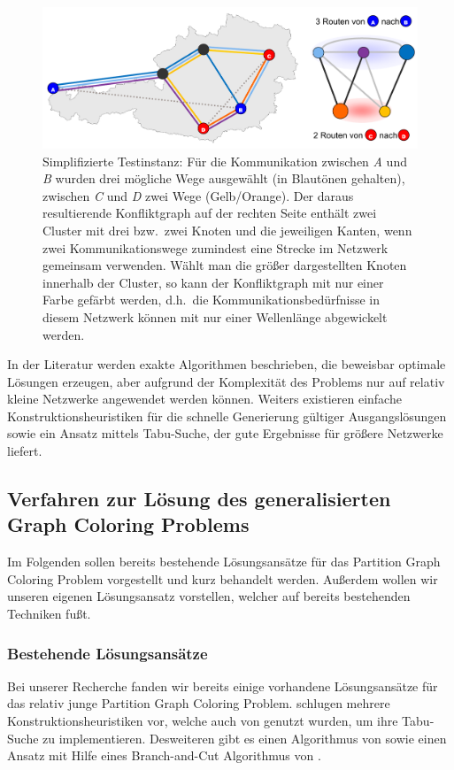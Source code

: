 \documentclass[paper=a4,fontsize=12pt]{scrartcl}
\begin{document}
\begin{figure}
    \includegraphics[width=1.0\textwidth]{../img/translation.pdf}
    \caption[Simplifizierte Testinstanz]{Simplifizierte Testinstanz: Für die Kommunikation zwischen \emph{A} und \emph{B} wurden drei mögliche Wege ausgewählt (in Blautönen gehalten), zwischen \emph{C} und \emph{D} zwei Wege (Gelb/Orange). Der daraus resultierende Konfliktgraph auf der rechten Seite enthält zwei Cluster mit drei bzw.\ zwei Knoten und die jeweiligen Kanten, wenn zwei Kommunikationswege zumindest eine Strecke im Netzwerk gemeinsam verwenden. Wählt man die größer dargestellten Knoten innerhalb der Cluster, so kann der Konfliktgraph mit nur einer Farbe gefärbt werden, d.h.\ die Kommunikationsbedürfnisse in diesem Netzwerk können mit nur einer Wellenlänge abgewickelt werden.}
    \label{fig:translation}
\end{figure}

In der Literatur werden exakte Algorithmen beschrieben, die beweisbar optimale Lös\-ung\-en erzeugen, aber aufgrund der Komplexität des Problems nur auf relativ kleine Netzwerke angewendet werden können. Weiters existieren einfache Konstruktionsheuristiken für die schnelle Generierung gültiger Ausgangslösungen sowie ein Ansatz mittels Tabu-Suche, der gute Ergebnisse für größere Netzwerke liefert.

\subsection{Verfahren zur Lösung des generalisierten Graph Coloring Problems}
Im Folgenden sollen bereits bestehende Lösungsansätze für das Partition Graph Coloring Problem vorgestellt und kurz behandelt werden. Außerdem wollen wir unseren eigenen Lösungsansatz vorstellen, welcher auf bereits bestehenden Techniken fußt.

\subsubsection{Bestehende Lösungsansätze}
Bei unserer Recherche fanden wir bereits einige vorhandene Lösungsansätze für das relativ junge Partition Graph Coloring Problem. \citet*{Li2000} schlugen mehrere Konstruktionsheuristiken vor, welche auch von \citet*{Noronha2006} genutzt wurden, um ihre Tabu-Suche zu implementieren.
Desweiteren gibt es einen Algorithmus von \citet*{Lu2010} sowie einen Ansatz mit Hilfe eines Branch-and-Cut Algorithmus von \citet*{Palladino2011}.
\end{document}
